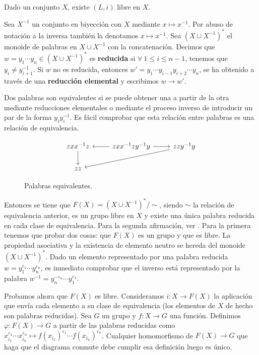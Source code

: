 \documentclass[bibtex, anon]{TEMat-article}
\begin{document}
\begin{teorema}\cite[\S II.5]{Aluffi}
	Dado un conjunto $X$, existe $(L,i)$ libre en $X$. %
\end{teorema}
\begin{demostracion}
	Sea $X^{-1}$ un conjunto en biyección con $X$ mediante $x\mapsto x^{-1}$. Por abuso de notación a la inversa también la denotamos $x\mapsto x^{-1}$. Sea $(X\cup X^{-1})^*$ el monoide de palabras en $X\cup X^{-1}$ con la concatenación. Decimos que $w=y_1\cdots y_n\in (X\cup X^{-1})^*$ es \textbf{reducida} si $\forall\ 1\leq i\leq n-1$, tenemos que $y_i\neq y_{i+1}^{-1}$. Si $w$ no es reducida, entonces $w'=y_1\cdots y_{i-1}y_{i+2}\cdots y_n$, se ha obtenido a través de una \textbf{reducción elemental} y escribimos $w\to w'$. 
	
	Dos palabras son equivalentes si se puede obtener una a partir de la otra mediante reducciones elementales o mediante el proceso inverso de introducir un par de la forma $y_iy_i^{-1}$. Es fácil comprobar que esta relación entre palabras es una relación de equivalencia.
	\begin{figure}[h!]
	\[
	\begin{tikzcd}
	zxx^{-1}z\arrow[d] & zxx^{-1}zy^{-1}y\arrow[l]\arrow[r] &zzy^{-1}y\arrow[lld]\\
	zz 
	\end{tikzcd}
	\]
	\caption{Palabras equivalentes.}
		\end{figure}
	
	Entonces se tiene que $F(X)=(X\cup X^{-1})^*/\sim$, siendo $\sim$ la relación de equivalencia anterior, es un grupo libre en $X$ y existe una única palabra reducida en cada clase de equivalencia. Para la segunda afirmación, ver \cite[\S 1]{reduced}. Para la primera tenemos que probar dos cosas: que $F(X)$ es un grupo y que es libre. La propiedad asociativa y la existencia de elemento neutro se hereda del monoide $(X\cup X^{-1})^*$. Dado un elemento representado por una palabra reducida $w=y_1^{\varepsilon_1}\cdots y_n^{\varepsilon_n}$, es inmediato comprobar que el inverso está representado por la palabra $w^{-1}=y_n^{-\varepsilon_n}\cdots y_1^{\varepsilon_1}$. 
	
	Probamos ahora que $F(X)$ es libre. Consideramos $i:X\to F(X)$ la aplicación que envía cada elemento a su clase de equivalencia (los elementos de $X$ de hecho son palabras reducidas). Sea $G$ un grupo y $f:X\to G$ una función. Definimos $\varphi:F(X)\to G$ a partir de las palabras reducidas como $x_{i_1}^{\varepsilon_1}\cdots x_{i_n}^{\varepsilon_n}\mapsto f(x_{i_1})^{\varepsilon_1}\cdots f(x_{i_n})^{\varepsilon_n}$. Cualquier homomorfismo de $F(X)\to G$ que haga que el diagrama conmute debe cumplir esa definición luego es único. %
	
\end{demostracion}
\end{document}
